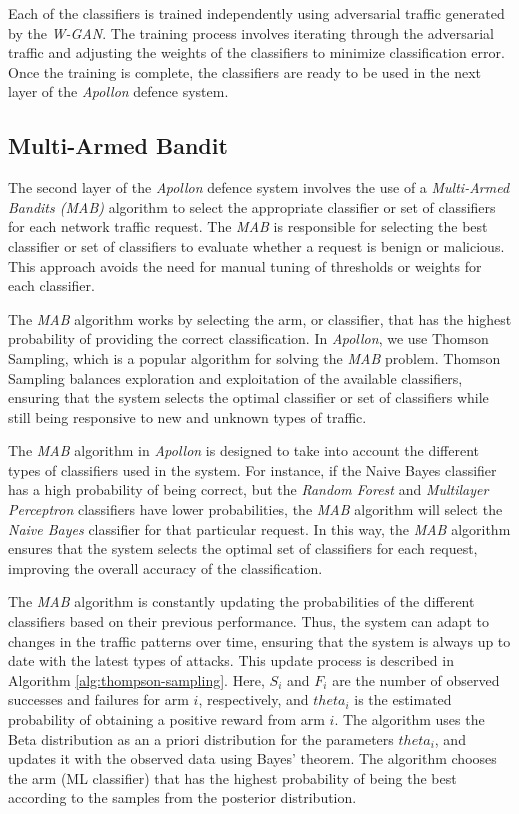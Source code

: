 Each of the classifiers is trained independently using adversarial traffic generated by the \textit{W-GAN}.
The training process involves iterating through the adversarial traffic and adjusting the weights of the classifiers to
minimize classification error.
Once the training is complete, the classifiers are ready to be used in the next layer of the \textit{Apollon} defence system.

\subsection{Multi-Armed Bandit}\label{subsec:multi-armed-bandit}
The second layer of the \textit{Apollon} defence system involves the use of a \textit{Multi-Armed Bandits (MAB)} algorithm
to select the appropriate classifier or set of classifiers for each network traffic request.
The \textit{MAB} is responsible for selecting the best classifier or set of classifiers to evaluate whether a request is benign
or malicious.
This approach avoids the need for manual tuning of thresholds or weights for each classifier.

The \textit{MAB} algorithm works by selecting the arm, or classifier, that has the highest probability of providing the correct
classification.
In \textit{Apollon}, we use Thomson Sampling, which is a popular algorithm for solving the \textit{MAB} problem.
Thomson Sampling balances exploration and exploitation of the available classifiers, ensuring that the system selects
the optimal classifier or set of classifiers while still being responsive to new and unknown types of traffic.

The \textit{MAB} algorithm in \textit{Apollon} is designed to take into account the different types of classifiers used in the system.
For instance, if the Naive Bayes classifier has a high probability of being correct, but the \textit{Random Forest} and
\textit{Multilayer Perceptron} classifiers have lower probabilities, the \textit{MAB} algorithm will select the \textit{Naive Bayes}
classifier for that particular request.
In this way, the \textit{MAB} algorithm ensures that the system selects the optimal set of classifiers for each request,
improving the overall accuracy of the classification.

The \textit{MAB} algorithm is constantly updating the probabilities of the different classifiers based on their previous
performance.
Thus, the system can adapt to changes in the traffic patterns over time, ensuring that the system is always up to date
with the latest types of attacks.
This update process is described in Algorithm \ref{alg:thompson-sampling}.
Here, $S_i$ and $F_i$ are the number of observed successes and failures for arm $i$, respectively, and $theta_i$ 
is the estimated probability of obtaining a positive reward from arm $i$.
The algorithm uses the Beta distribution as an a priori distribution for the parameters $theta_i$, and updates it
with the observed data using Bayes' theorem.
The algorithm chooses the arm (ML classifier) that has the highest probability of being the best according to the
samples from the posterior distribution.

